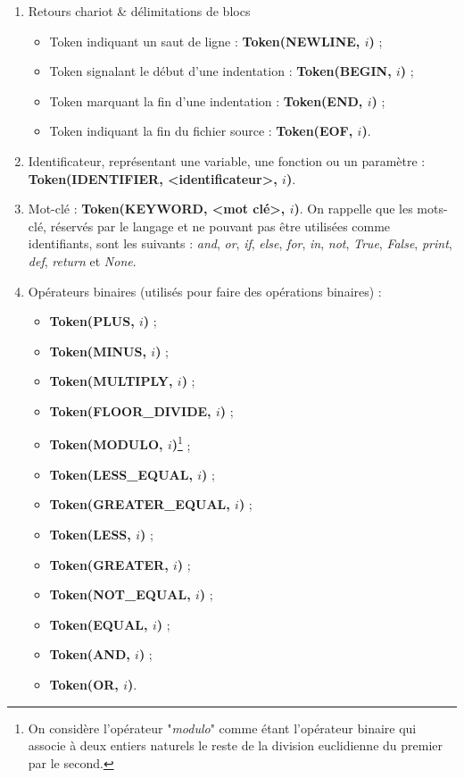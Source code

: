 \documentclass[a4paper, 12pt]{report}
\begin{document}
\begin{enumerate}

\item Retours chariot \& délimitations de blocs
\begin{itemize}
\item Token indiquant un saut de ligne : \textbf{Token(NEWLINE, $i$)} ;
\item Token signalant le début d'une indentation : \textbf{Token(BEGIN, $i$)} ;
\item Token marquant la fin d'une indentation : \textbf{Token(END, $i$)} ;
\item Token indiquant la fin du fichier source : \textbf{Token(EOF, $i$)}.\\
\end{itemize}

\item Identificateur, représentant une variable, une fonction ou un paramètre : \textbf{Token(IDENTIFIER, <identificateur>, $i$)}.\\

\item Mot-clé : \textbf{Token(KEYWORD, <mot clé>, $i$)}. On rappelle que les mots-clé, réservés par le langage et ne pouvant pas être utilisées comme identifiants, sont les suivants : \textit{and}, \textit{or}, \textit{if}, \textit{else}, \textit{for}, \textit{in}, \textit{not}, \textit{True}, \textit{False}, \textit{print}, \textit{def}, \textit{return} et \textit{None}.\\

\item Opérateurs binaires (utilisés pour faire des opérations binaires) :
\begin{itemize}
\item \textbf{Token(PLUS, $i$)} ;
\item \textbf{Token(MINUS, $i$)} ;
\item \textbf{Token(MULTIPLY, $i$)} ;
\item \textbf{Token(FLOOR{\_}DIVIDE, $i$)} ;
\item \textbf{Token(MODULO, $i$)}\footnote{On considère l'opérateur "\textit{modulo}" comme étant l'opérateur binaire qui associe à deux entiers naturels le reste de la division euclidienne du premier par le second.} ;
\item \textbf{Token(LESS{\_}EQUAL, $i$)} ;
\item \textbf{Token(GREATER{\_}EQUAL, $i$)} ;
\item \textbf{Token(LESS, $i$)} ;
\item \textbf{Token(GREATER, $i$)} ;
\item \textbf{Token(NOT{\_}EQUAL, $i$)} ;
\item \textbf{Token(EQUAL, $i$)} ;
\item \textbf{Token(AND, $i$)} ;
\item \textbf{Token(OR, $i$)}.\\
\end{itemize}


\end{enumerate}
\end{document}
